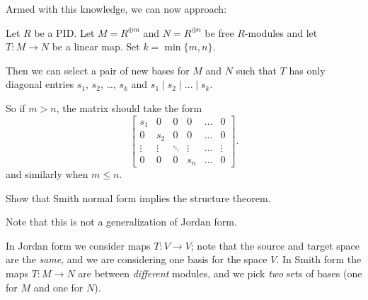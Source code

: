Armed with this knowledge, we can now approach:
\begin{theorem}
	Let $R$ be a PID.
	Let $M = R^{\oplus m}$ and $N = R^{\oplus n}$ be free $R$-modules
	and let $T \colon M \to N$ be a linear map.
	Set $k = \min\{m,n\}$.

	Then we can select a pair of new bases for $M$ and $N$ such that
	$T$ has only diagonal entries $s_1$, $s_2$, \dots, $s_k$
	and $s_1 \mid s_2 \mid \dots \mid s_k$.
\end{theorem}
So if $m > n$, the matrix should take the form
\[
	\begin{bmatrix}
		s_1 & 0 & 0 & 0 & \dots & 0 \\
		0 & s_2 & 0 & 0 & \dots & 0 \\
		\vdots & \vdots & \ddots & \vdots & \dots & \vdots \\
		0 & 0 & 0 & s_n & \dots & 0
	\end{bmatrix}.
\]
and similarly when $m \le n$.
\begin{ques}
	Show that Smith normal form implies the structure theorem.
\end{ques}

\begin{remark}
	Note that this is not a generalization of Jordan form.
	\begin{itemize}
		\ii In Jordan form we consider maps $T \colon V \to V$;
		note that the source and target space are the \emph{same},
		and we are considering one basis for the space $V$.
		\ii In Smith form the maps $T \colon M \to N$ are between
		\emph{different} modules, and we pick \emph{two} sets of bases
		(one for $M$ and one for $N$).
	\end{itemize}
\end{remark}

